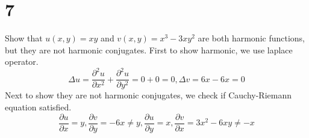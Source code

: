 \documentclass{article}
\begin{document}
\section*{7}
\begin{myleftlinebox}
    Show that \(u(x,y)=xy\) and \(v(x,y)=x^3-3xy^2 \) are both harmonic functions, but they are not harmonic conjugates.
    \tcbline
    First to show harmonic, we use laplace operator.
    \[\Delta u=\frac{\partial^2 u}{\partial x^2}+\frac{\partial^2 u}{\partial y^2}=0+0=0,\Delta v = 6x-6x=0\]
    Next to show they are not harmonic conjugates, we check if Cauchy-Riemann equation satisfied.
    \[\frac{\partial u}{\partial x}=y,\frac{\partial v}{\partial y}=-6x\neq y,\frac{\partial u}{\partial y}=x,\frac{\partial v}{\partial x}=3x^2-6xy\neq -x\]
\end{myleftlinebox}
\end{document}
